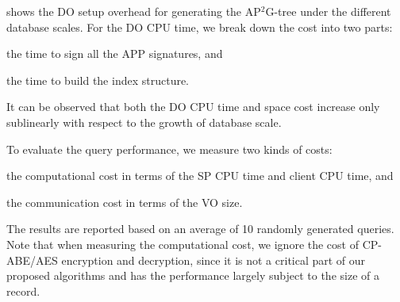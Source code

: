  shows the DO setup overhead for generating the AP$^2$G-tree under the different database scales. For the DO CPU time, we break down the cost into two parts:
\begin{inlineenum}
    \item the time to sign all the APP signatures, and
    \item the time to build the index structure.
\end{inlineenum}
It can be observed that both the DO CPU time and space cost increase only sublinearly with respect to the growth of database scale.

\begin{table}[t]
    \centering
    \caption{DO Setup Overhead}\label{tab:access-control:do-setup}
\end{table}

To evaluate the query performance, we measure two kinds of costs:
\begin{inlineenum}
    \item the computational cost in terms of the SP CPU time and client CPU time, and
    \item the communication cost in terms of the VO size.
\end{inlineenum}
The results are reported based on an average of 10 randomly generated queries. Note that when measuring the computational cost, we ignore the cost of CP-ABE/AES encryption and decryption, since it is not a critical part of our proposed algorithms and has the performance largely subject to the size of a record.


